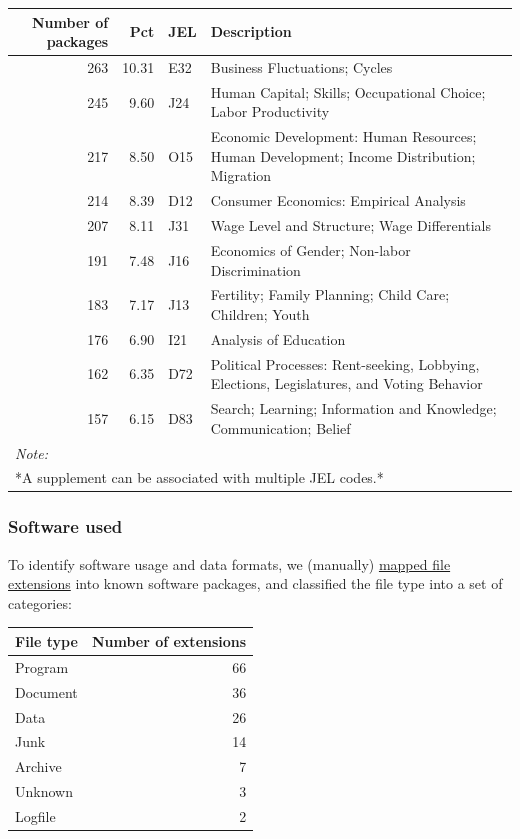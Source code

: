 \documentclass[]{article}
\begin{document}
\begin{table}[H]
\centering
\begin{tabular}{r|r|l|l}
\hline
Number of packages & Pct & JEL & Description\\
\hline
263 & 10.31 & E32 & Business Fluctuations; Cycles\\
\hline
245 & 9.60 & J24 & Human Capital; Skills; Occupational Choice; Labor Productivity\\
\hline
217 & 8.50 & O15 & Economic Development: Human Resources; Human Development; Income Distribution; Migration\\
\hline
214 & 8.39 & D12 & Consumer Economics: Empirical Analysis\\
\hline
207 & 8.11 & J31 & Wage Level and Structure; Wage Differentials\\
\hline
191 & 7.48 & J16 & Economics of Gender; Non-labor Discrimination\\
\hline
183 & 7.17 & J13 & Fertility; Family Planning; Child Care; Children; Youth\\
\hline
176 & 6.90 & I21 & Analysis of Education\\
\hline
162 & 6.35 & D72 & Political Processes: Rent-seeking, Lobbying, Elections, Legislatures, and Voting Behavior\\
\hline
157 & 6.15 & D83 & Search; Learning; Information and Knowledge; Communication; Belief\\
\hline
\multicolumn{4}{l}{\textit{Note: }}\\
\multicolumn{4}{l}{*A supplement can be associated with multiple JEL codes.*}\\
\end{tabular}
\end{table}

\hypertarget{software-used}{%
\subsubsection{Software used}\label{software-used}}

To identify software usage and data formats, we (manually)
\href{../data/original/aea_file_ext.csv}{mapped file extensions} into
known software packages, and classified the file type into a set of
categories:

\begin{table}[H]
\centering
\begin{tabular}{l|r}
\hline
File type & Number of extensions\\
\hline
Program & 66\\
\hline
Document & 36\\
\hline
Data & 26\\
\hline
Junk & 14\\
\hline
Archive & 7\\
\hline
Unknown & 3\\
\hline
Logfile & 2\\
\hline
\end{tabular}
\end{table}
\end{document}

